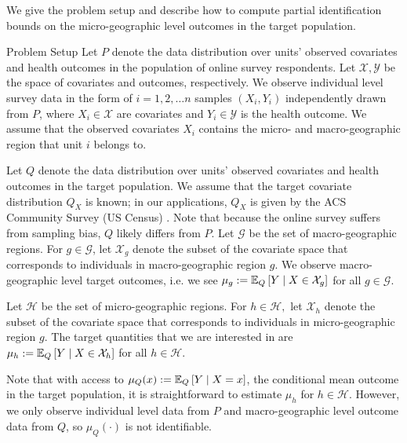 We give the problem setup and describe how to compute partial identification bounds on the micro-geographic level outcomes in the target population.

\begin{subsection}{Problem Setup}
Let $P$ denote the data distribution over units' observed covariates and health outcomes in the population of online survey respondents. Let $\mathcal{X}, \mathcal{Y}$ be the space of covariates and outcomes, respectively. We observe individual level survey data in the form of $i=1,2, \dots n$ samples $(X_{i}, Y_{i})$ independently drawn from $P$, where $X_{i} \in \mathcal{X}$ are covariates and $Y_{i} \in \mathcal{Y}$ is the health outcome. We assume that the observed covariates $X_{i}$ contains the micro- and macro-geographic region that unit $i$ belongs to. 

Let $Q$ denote the data distribution over units' observed covariates and health outcomes in the target population. We assume that the target covariate distribution $Q_{X}$ is known; in our applications, $Q_{X}$ is given by the ACS Community Survey (US Census) \citep{bureau2021american}. Note that because the online survey suffers from sampling bias, $Q$ likely differs from $P$. Let $\mathcal{G}$ be the set of macro-geographic regions. For $g \in \mathcal{G}$, let $\mathcal{X}_{g}$ denote the subset of the covariate space that corresponds to individuals in macro-geographic region $g$. We observe macro-geographic level target outcomes, i.e. we see $\mu_{g} := \EE[Q]{Y \mid X \in \mathcal{X}_{g}} $ for all $g \in \mathcal{G}.$ 

Let $\mathcal{H}$ be the set of micro-geographic regions. For $h \in \mathcal{H},$ let $\mathcal{X}_{h}$ denote the subset of the covariate space that corresponds to individuals in micro-geographic region $g$. The target quantities that we are interested in are $\mu_{h}:= \EE[Q]{Y \mid X \in \mathcal{X}_{h}}$ for all $h \in \mathcal{H}.$

Note that with access to $\mu_{Q}(x):= \EE[Q]{Y \mid X=x}$, the conditional mean outcome in the target population, it is straightforward to estimate $\mu_{h}$ for $h \in \mathcal{H}.$ However, we only observe individual level data from $P$ and macro-geographic level outcome data from $Q$, so $\mu_{Q}(\cdot)$ is not identifiable.


\end{subsection}
